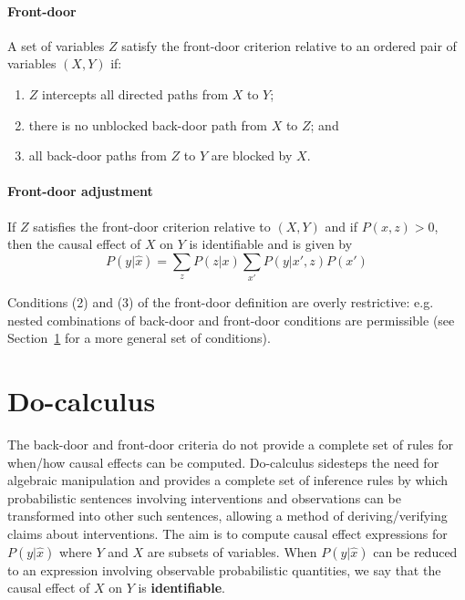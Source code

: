 \documentclass[11pt]{article}
\numberwithin{equation}{section}
\begin{document}
\paragraph{Front-door} 
A set of variables $Z$ satisfy the front-door criterion relative to an ordered pair of variables $(X, Y)$ if:
\begin{enumerate}[noitemsep]
\item $Z$ intercepts all directed paths from $X$ to $Y$; 
\item there is no unblocked back-door path from $X$ to $Z$; and
\item all back-door paths from $Z$ to $Y$ are blocked by $X$.
\end{enumerate}

\paragraph{Front-door adjustment}
If $Z$ satisfies the front-door criterion relative to $(X, Y)$ and if $P(x, z) > 0$, then the causal effect of $X$ on $Y$ is identifiable and is given by
\begin{equation}
P(y|\hat{x}) = \sum_z P(z|x) \sum_{x'} P(y|x',z)P(x')
\end{equation}

Conditions (2) and (3) of the front-door definition are overly restrictive: e.g. nested combinations of back-door and front-door conditions are permissible (see Section~\ref{sec:do-calc} for a more general set of conditions).

\section{Do-calculus} \label{sec:do-calc}

The back-door and front-door criteria do not provide a complete set of rules for when/how causal effects can be computed. Do-calculus sidesteps the need for algebraic manipulation and provides a complete set of inference rules by which probabilistic sentences involving interventions and observations can be transformed into other such sentences, allowing a method of deriving/verifying claims about interventions. The aim is to compute causal effect expressions for $P(y|\hat{x})$ where $Y$ and $X$ are subsets of variables. When $P(y|\hat{x})$ can be reduced to an expression involving observable probabilistic quantities, we say that the causal effect of $X$ on $Y$ is \textbf{identifiable}.
\end{document}

